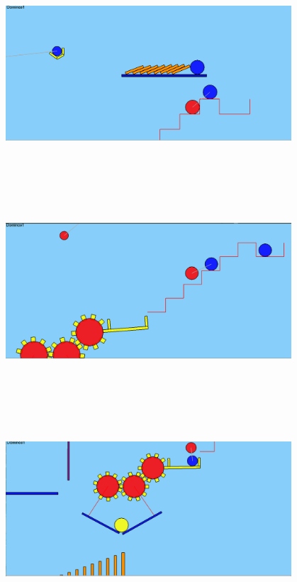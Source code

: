 \documentclass{article}
\begin{document}
{\\
\includegraphics[width=0.8\textwidth, height=80mm]{5.png}
\\
\includegraphics[width=0.8\textwidth, height=80mm]{6.png}
\\
\includegraphics[width=0.8\textwidth, height=80mm]{7.png}
\\
}
\end{document}
